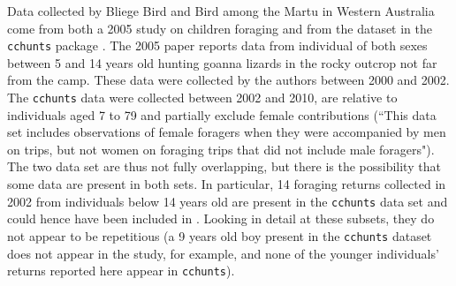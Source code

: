 Data collected by Bliege Bird and Bird among the Martu in Western Australia come from both a 2005 study on children foraging \citep{bird_mardu_2005} and from the dataset in the \texttt{cchunts} package \citep{koster_life_2020}. The 2005 paper reports data from individual of both sexes between 5 and 14 years old hunting goanna lizards in the rocky outcrop not far from the camp. These data were collected by the authors between 2000 and 2002. The \texttt{cchunts} data were collected between 2002 and 2010, are relative to individuals aged 7 to 79 and partially exclude female contributions (``This data set includes observations of female foragers when they were accompanied by men on trips, but not women on foraging trips that did not include male foragers"). The two data set are thus not fully overlapping, but there is the possibility that some data are present in both sets. In particular, 14 foraging returns collected in 2002 from individuals below 14 years old are present in the \texttt{cchunts} data set and could hence have been included in \citet{bird_mardu_2005}. Looking in detail at these subsets, they do not appear to be repetitious (a 9 years old boy present in the \texttt{cchunts} dataset does not appear in the \citet{bird_mardu_2005} study, for example, and none of the younger individuals' returns reported here appear in \texttt{cchunts}). 

